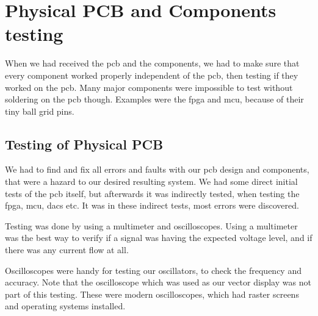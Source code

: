 \section{Physical PCB and Components testing}

When we had received the \gls{pcb} and the components, we had to make sure that every component worked properly independent of the \gls{pcb}, then testing if they worked on the \gls{pcb}. Many major components were impossible to test without soldering on the \gls{pcb} though. Examples were the \gls{fpga} and \gls{mcu}, because of their tiny ball grid pins.

\subsection{Testing of Physical PCB}
We had to find and fix all errors and faults with our \gls{pcb} design and components, that were a hazard to our desired resulting system.  
We had some direct initial tests of the \gls{pcb} itself, but afterwards it was indirectly tested, when testing the \gls{fpga}, \gls{mcu}, \gls{dac}s etc. It was in these indirect tests, most errors were discovered.

Testing was done by using a multimeter and oscilloscopes. Using a multimeter was the best way to verify if a signal was having the expected voltage level, and if there was any current flow at all.

Oscilloscopes were handy for testing our oscillators, to check the frequency and accuracy. Note that the oscilloscope which was used as our vector display was not part of this testing. These were modern oscilloscopes, which had raster screens and operating systems installed.

